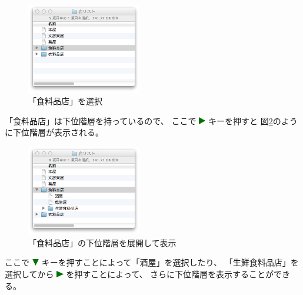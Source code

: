 \documentclass[twoside]{wiss}
\def\figwidth{50mm}
\def\down{ \includegraphics[width=3mm,bb=0 0 36 36]{figures/downtriangle.pdf} }
\def\right{ \includegraphics[width=3mm,bb=0 0 36 36]{figures/righttriangle.pdf} }
\begin{document}
\begin{figure}[H]
\centerline{\includegraphics[width=\figwidth,bb=0 0 344 272]{figures/c074cd6daec3da0341125d1492b8a09c.png}}
\caption{「食料品店」を選択}
\label{screenshot4}
\end{figure}

\noindent
「食料品店」は下位階層を持っているので、
ここで{\right}キーを押すと
図\ref{screenshot5}のように下位階層が表示される。

\begin{figure}[H]
\centerline{\includegraphics[width=\figwidth,bb=0 0 344 272]{figures/51d867d4721f65c18e84172c8818e137.png}}
\caption{「食料品店」の下位階層を展開して表示}
\label{screenshot5}
\end{figure}

\noindent
ここで{\down}キーを押すことによって「酒屋」を選択したり、
「生鮮食料品店」を選択してから{\right}を押すことによって、
さらに下位階層を表示することができる。
\end{document}
